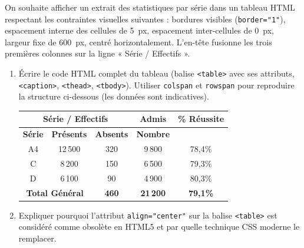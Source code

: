 \documentclass[11pt]{article}
\begin{document}
\begin{exercice}
On souhaite afficher un extrait des statistiques par série dans un tableau HTML respectant les contraintes visuelles suivantes : bordures visibles (\texttt{border="1"}), espacement interne des cellules de \SI{5}{px}, espacement inter-cellules de \SI{0}{px}, largeur fixe de \SI{600}{px}, centré horizontalement. L'en-tête fusionne les trois premières colonnes sur la ligne « Série / Effectifs ».
\begin{enumerate}
    \item Écrire le code HTML complet du tableau (balise \texttt{<table>} avec ses attributs, \texttt{<caption>}, \texttt{<thead>}, \texttt{<tbody>}). Utiliser \texttt{colspan} et \texttt{rowspan} pour reproduire la structure ci-dessous (les données sont indicatives).
    \begin{center}
    \begin{tabular}{|c|c|c|c|c|}
    \hline
    \multicolumn{3}{|c|}{Série / Effectifs} & \textbf{Admis} & \textbf{\% Réussite} \\ \hline
    \textbf{Série} & \textbf{Présents} & \textbf{Absents} & \textbf{Nombre} &  \\ \hline
    A4 & 12\,500 & 320 & 9\,800 & 78,4\% \\ \hline
    C & 8\,200 & 150 & 6\,500 & 79,3\% \\ \hline
    D & 6\,100 & 90 & 4\,900 & 80,3\% \\ \hline
    \multicolumn{2}{|c|}{\textbf{Total Général}} & \textbf{460} & \textbf{21\,200} & \textbf{79,1\%} \\ \hline
    \end{tabular}
    \end{center}
    \item Expliquer pourquoi l'attribut \texttt{align="center"} sur la balise \texttt{<table>} est considéré comme obsolète en HTML5 et par quelle technique CSS moderne le remplacer.
\end{enumerate}
\end{exercice}
\end{document}
